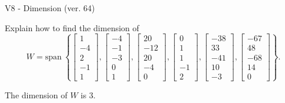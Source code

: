 \begin{exercise}
  \begin{exerciseTitle}V8 - Dimension (ver. 64)\end{exerciseTitle}
  \begin{exerciseStatement}
    Explain how to find the dimension of 
\[W=\mathrm{span}\ \left\{\left[\begin{array}{r}
1 \\
-4 \\
2 \\
-1 \\
1
\end{array}\right] , \left[\begin{array}{r}
-4 \\
-1 \\
-3 \\
0 \\
1
\end{array}\right] , \left[\begin{array}{r}
20 \\
-12 \\
20 \\
-4 \\
0
\end{array}\right] , \left[\begin{array}{r}
0 \\
1 \\
1 \\
-1 \\
2
\end{array}\right] , \left[\begin{array}{r}
-38 \\
33 \\
-41 \\
10 \\
-3
\end{array}\right] , \left[\begin{array}{r}
-67 \\
48 \\
-68 \\
14 \\
0
\end{array}\right]\right\}.\]



  \end{exerciseStatement}
  \begin{exerciseAnswer}
   The dimension of \(W\) is  \(3\).
  


  \end{exerciseAnswer}
\end{exercise}